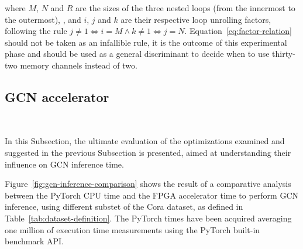 \documentclass[11pt,a4paper,twocolumn]{article}
\begin{document}
where $M$, $N$ and $R$ are the sizes of the three nested loops (from the innermost to the outermost), , and $i$, $j$ and $k$ are their respective loop unrolling factors, following the rule $j \neq 1 \iff i=M \land k \neq 1 \iff j=N$.
Equation~\ref{eq:factor-relation} should not be taken as an infallible rule, it is the outcome of this experimental phase and should be used as a general discriminant to decide when to use thirty-two memory channels instead of two.

\subsection{GCN accelerator}
\label{subsec:gcn-accelerator}%

\begin{table}[t]
\centering
    \\[10pt]
    \caption{Cora sub-dataset used for GCN infernce}
    \label{tab:dataset-definition}
\end{table}

In this Subsection, the ultimate evaluation of the optimizations examined and suggested in the previous Subsection is presented, aimed at understanding their influence on GCN inference time.

Figure~\ref{fig:gcn-inference-comparison} shows the result of a comparative analysis between the PyTorch CPU time and the FPGA accelerator time to perform GCN inference, using different substet of the Cora dataset, as defined in Table~\ref{tab:dataset-definition}.
The PyTorch times have been acquired averaging one million of execution time measurements using the PyTorch built-in benchmark API\@.
\end{document}
